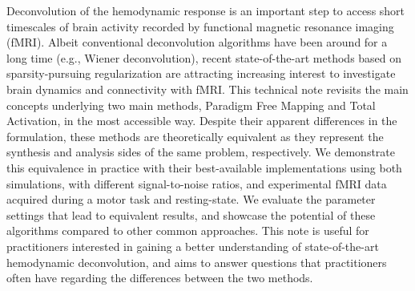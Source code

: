Deconvolution of the hemodynamic response is an important step to access short
timescales of brain activity recorded by functional magnetic resonance imaging
(fMRI). Albeit conventional deconvolution algorithms have been around for a long
time (e.g., Wiener deconvolution), recent state-of-the-art methods based on
sparsity-pursuing regularization are attracting increasing interest to
investigate brain dynamics and connectivity with fMRI. This technical note
revisits the main concepts underlying two main methods, Paradigm Free Mapping
and Total Activation, in the most accessible way. Despite their apparent
differences in the formulation, these methods are theoretically equivalent as
they represent the synthesis and analysis sides of the same problem,
respectively. We demonstrate this equivalence in practice with their
best-available implementations using both simulations, with different
signal-to-noise ratios, and experimental fMRI data acquired during a motor task
and resting-state. We evaluate the parameter settings that lead to equivalent
results, and showcase the potential of these algorithms compared to other common
approaches. This note is useful for practitioners interested in gaining a better
understanding of state-of-the-art hemodynamic deconvolution, and aims to answer
questions that practitioners often have regarding the differences between the
two methods.
